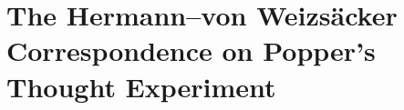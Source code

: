 \documentclass[pdflatex]{sn-jnl}
\newcommand{\vW}{von Weizsäcker\xspace}
\providecommand{\DIFaddbegin}{} %
\providecommand{\DIFaddend}{} %
\providecommand{\DIFdelend}{} %
\begin{document}
\DIFdelend \DIFaddbegin \section{The Hermann--\vW Correspondence on Popper's Thought Experiment}
\DIFaddend %
\end{document}
